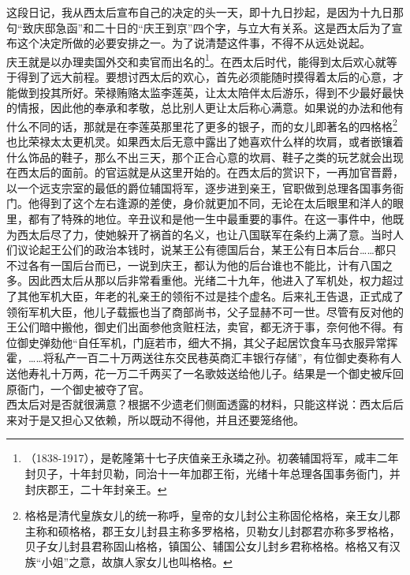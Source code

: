 这段日记，我从西太后宣布自己的决定的头一天，即十九日抄起，是因为十九日那句“致庆邸急函”和二十日的“庆王到京”四个字，与立大有关系。这是西太后为了宣布这个决定所做的必要安排之一。为了说清楚这件事，不得不从远处说起。\\

庆王就是以办理卖国外交和卖官而出名的\footnote{（1838-1917），是乾隆第十七子庆值亲王永璘之孙。初袭辅国将军，咸丰二年封贝子，十年封贝勒，同治十一年加郡王衔，光绪十年总理各国事务衙门，并封庆郡王，二十年封亲王。}。在西太后时代，能得到太后欢心就等于得到了远大前程。要想讨西太后的欢心，首先必须能随时摸得着太后的心意，才能做到投其所好。荣禄贿赂太监李莲英，让太太陪伴太后游乐，得到不少最好最快的情报，因此他的奉承和孝敬，总比别人更让太后称心满意。如果说的办法和他有什么不同的话，那就是在李莲英那里花了更多的银子，而的女儿即著名的四格格\footnote{格格是清代皇族女儿的统一称呼，皇帝的女儿封公主称固伦格格，亲王女儿郡主称和硕格格，郡王女儿封县主称多罗格格，贝勒女儿封郡君亦称多罗格格，贝子女儿封县君称固山格格，镇国公、辅国公女儿封乡君称格格。格格又有汉族“小姐”之意，故旗人家女儿也叫格格。}也比荣禄太太更机灵。如果西太后无意中露出了她喜欢什么样的坎肩，或者嵌镶着什么饰品的鞋子，那么不出三天，那个正合心意的坎肩、鞋子之类的玩艺就会出现在西太后的面前。的官运就是从这里开始的。在西太后的赏识下，一再加官晋爵，以一个远支宗室的最低的爵位辅国将军，逐步进到亲王，官职做到总理各国事务衙门。他得到了这个左右逢源的差使，身价就更加不同，无论在太后眼里和洋人的眼里，都有了特殊的地位。辛丑议和是他一生中最重要的事件。在这一事件中，他既为西太后尽了力，使她躲开了祸首的名义，也让八国联军在条约上满了意。当时人们议论起王公们的政治本钱时，说某王公有德国后台，某王公有日本后台……都只不过各有一国后台而已，一说到庆王，都认为他的后台谁也不能比，计有八国之多。因此西太后从那以后非常看重他。光绪二十九年，他进入了军机处，权力超过了其他军机大臣，年老的礼亲王的领衔不过是挂个虚名。后来礼王告退，正式成了领衔军机大臣，他儿子载振也当了商部尚书，父子显赫不可一世。尽管有反对他的王公们暗中搬他，御史们出面参他贪赃枉法，卖官，都无济于事，奈何他不得。有位御史弹劾他“自任军机，门庭若市，细大不捐，其父子起居饮食车马衣服异常挥霍，……将私产一百二十万两送往东交民巷英商汇丰银行存储”，有位御史奏称有人送他寿礼十万两，花一万二千两买了一名歌妓送给他儿子。结果是一个御史被斥回原衙门，一个御史被夺了官。\\

西太后对是否就很满意？根据不少遗老们侧面透露的材料，只能这样说：西太后后来对于是又担心又依赖，所以既动不得他，并且还要笼络他。\\

